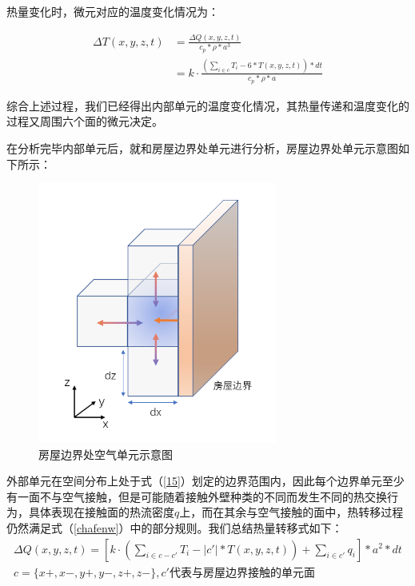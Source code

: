 \documentclass{my_paper}
\begin{document}
热量变化时，微元对应的温度变化情况为：

\begin{equation}
    \begin{aligned}
        \Delta T(x,y,z,t) &= \frac{\Delta Q(x,y,z,t)}{c_p * \rho * a^3}\\
        & = k \cdot \frac{(\sum_{i\in c}T_i-6*T(x,y,z,t))*dt}{c_p * \rho * a}
    \end{aligned}
    \label{wdjs}
\end{equation}

综合上述过程，我们已经得出内部单元的温度变化情况，其热量传递和温度变化的过程又周围六个面的微元决定。

\newpage
在分析完毕内部单元后，就和房屋边界处单元进行分析，房屋边界处单元示意图如下所示：
\begin {figure}[h]
\centering %
\includegraphics[width=0.7\textwidth]{wyb.png}
\caption{房屋边界处空气单元示意图} %
\label{five}
\end {figure}

外部单元在空间分布上处于式（\ref{15}）划定的边界范围内，因此每个边界单元至少有一面不与空气接触，但是可能随着接触外壁种类的不同而发生不同的热交换行为，具体表现在接触面的热流密度$q$上，而在其余与空气接触的面中，热转移过程仍然满足式（\ref{chafenw}）中的部分规则。我们总结热量转移式如下：
\begin{equation}
    \begin{aligned}
        \Delta Q(x,y,z,t) = [k \cdot (\sum_{i\in c-c'}T_i-|c'|*T(x,y,z,t))+\sum_{i\in c'}q_i]*a^2*dt\\
        c = \{x+,x-,y+,y-,z+,z-\},c'\text{代表与房屋边界接触的单元面}
    \end{aligned}
\label{}
\end{equation}
\end{document}
